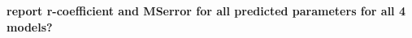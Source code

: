 \documentclass[12pt]{iopart}
\begin{document}



\textbf{report r-coefficient and MSerror for all predicted parameters for all 4 models?} 

\end{document}
